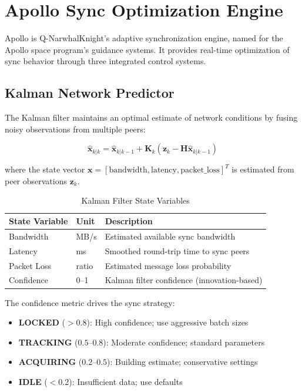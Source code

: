 \documentclass[11pt,a4paper]{article}
\begin{document}
\section{Apollo Sync Optimization Engine}

Apollo is Q-NarwhalKnight's adaptive synchronization engine, named for the Apollo space program's guidance systems. It provides real-time optimization of sync behavior through three integrated control systems.

\subsection{Kalman Network Predictor}

The Kalman filter maintains an optimal estimate of network conditions by fusing noisy observations from multiple peers:

\begin{equation}
\hat{\mathbf{x}}_{k|k} = \hat{\mathbf{x}}_{k|k-1} + \mathbf{K}_k(\mathbf{z}_k - \mathbf{H}\hat{\mathbf{x}}_{k|k-1})
\end{equation}

where the state vector $\mathbf{x} = [\text{bandwidth}, \text{latency}, \text{packet\_loss}]^T$ is estimated from peer observations $\mathbf{z}_k$.

\begin{table}[H]
\centering
\begin{tabular}{llp{6cm}}
\toprule
\textbf{State Variable} & \textbf{Unit} & \textbf{Description} \\
\midrule
Bandwidth & MB/s & Estimated available sync bandwidth \\
Latency & ms & Smoothed round-trip time to sync peers \\
Packet Loss & ratio & Estimated message loss probability \\
Confidence & 0--1 & Kalman filter confidence (innovation-based) \\
\bottomrule
\end{tabular}
\caption{Kalman Filter State Variables}
\end{table}

The confidence metric drives the sync strategy:
\begin{itemize}
    \item \textbf{LOCKED} ($> 0.8$): High confidence; use aggressive batch sizes
    \item \textbf{TRACKING} ($0.5$--$0.8$): Moderate confidence; standard parameters
    \item \textbf{ACQUIRING} ($0.2$--$0.5$): Building estimate; conservative settings
    \item \textbf{IDLE} ($< 0.2$): Insufficient data; use defaults
\end{itemize}
\end{document}
